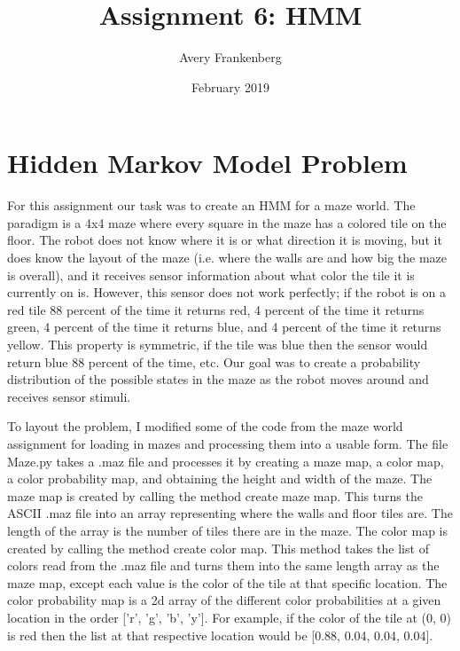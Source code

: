 \documentclass{article}
\title{Assignment 6: HMM}
\author{Avery Frankenberg}
\date{February 2019}
\begin{document}
\maketitle

\section{Hidden Markov Model Problem}
For this assignment our task was to create an HMM for a maze world. The paradigm is a 4x4 maze where every square in the maze has a colored tile on the floor. The robot does not know where it is or what direction it is moving, but it does know the layout of the maze (i.e. where the walls are and how big the maze is overall), and it receives sensor information about what color the tile it is currently on is. However, this sensor does not work perfectly; if the robot is on a red tile 88 percent of the time it returns red, 4 percent of the time it returns green, 4 percent of the time it returns blue, and 4 percent of the time it returns yellow. This property is symmetric, if the tile was blue then the sensor would return blue 88 percent of the time, etc. Our goal was to create a probability distribution of the possible states in the maze as the robot moves around and receives sensor stimuli.

To layout the problem, I modified some of the code from the maze world assignment for loading in mazes and processing them into a usable form. The file Maze.py takes a .maz file and processes it by creating a maze map, a color map, a color probability map, and obtaining the height and width of the maze. The maze map is created by calling the method create maze map. This turns the ASCII .maz file into an array representing where the walls and floor tiles are. The length of the array is the number of tiles there are in the maze. The color map is created by calling the method create color map. This method takes the list of colors read from the .maz file and turns them into the same length array as the maze map, except each value is the color of the tile at that specific location. The color probability map is a 2d array of the different color probabilities at a given location in the order ['r', 'g', 'b', 'y']. For example, if the color of the tile at (0, 0) is red then the list at that respective location would be [0.88, 0.04, 0.04, 0.04]. 
\end{document}
